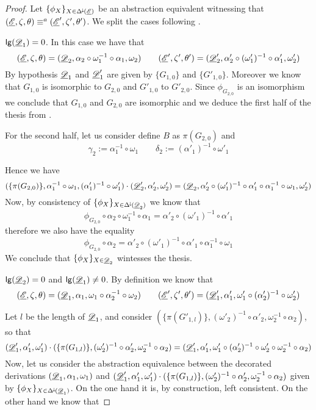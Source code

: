 \begin{proof} Let $\{\phi_X\}_{X\in \Delta^{\hspace{-1pt}\downarrow\hspace{-1pt}}(\underline{\mathscr{E}})}$ be an abstraction equivalent witnessing that $(\underline{\mathscr{E}}, \zeta, \theta)\equiv^{a}(\underline{\mathscr{E}}', \zeta', \theta')$.	We split the cases following .
	
	\smallskip \noindent $\mathsf{lg}(\underline{\mathscr{D}}_1)=0$. In this case we have that
	\[(\underline{\mathscr{E}}, \zeta, \theta)=(\underline{\mathscr{D}}_2, \alpha_2\circ \omega^{-1}_1 \circ \alpha_1, \omega_2) \qquad (\underline{\mathscr{E}}', \zeta', \theta')=(\underline{\mathscr{D}}'_2, \alpha'_2\circ (\omega'_1)^{-1} \circ \alpha'_1, \omega'_2)\]
	By hypothesis $\underline{\mathscr{D}}_1$ and $\underline{\mathscr{D}}'_1$ are given by $\{G_{1,0}\}$ and $\{G'_{1,0}\}$. Moreover we know that $G_{1,0}$ is isomorphic to $G_{2,0}$ and  $G'_{1,0}$ to $G'_{2,0}$. Since $\phi_{G_{2,0}}$ is an isomorphism we conclude that $G_{1,0}$ and $G_{2,0}$ are isomorphic and we deduce the first half of the thesis from . 
	
	For the second half, let us consider define $B$ as $\pi(G_{2,0})$ and
	\[\gamma_2:=\alpha^{-1}_1\circ \omega_1\qquad  \delta_2:=(\alpha'_1)^{-1}\circ \omega'_1  \]
	
	Hence we have
\[
(\{\pi(G_{2,0})\}, \alpha^{-1}_1\circ \omega_1,  (\alpha'_1)^{-1}\circ \omega'_1 )\cdot(\underline{\mathscr{D}}'_2, \alpha'_2, \omega'_2)  =(\underline{\mathscr{D}}_2, \alpha'_2\circ (\omega'_1)^{-1} \circ \alpha'_1\circ \alpha_1^{-1}\circ \omega_1, \omega'_2)\]
Now, by consistency of $\{\phi_{X}\}_{X\in \Delta^{\hspace{-1pt}\downarrow\hspace{-1pt}}(\underline{\mathscr{D}}_2)}$ we know that
\[\phi_{G_{2,0}}\circ \alpha_2\circ \omega^{-1}_1\circ \alpha_1=\alpha'_2\circ (\omega'_1)^{-1} \circ \alpha'_1\]
	therefore we also have the equality
	\[\phi_{G_{2,0}}\circ \alpha_2=\alpha'_2\circ (\omega'_1)^{-1} \circ \alpha'_1 \circ \alpha^{-1}_1\circ \omega_1 \]
	We conclude that $\{\phi_X\}_{X\in \underline{\mathscr{D}}_2}$ wintesses the thesis.
	
	\smallskip \noindent $\mathsf{lg}(\underline{\mathscr{D}}_2)=0$ and $\mathsf{lg}(\underline{\mathscr{D}}_1)\neq 0$. By definition we know that
	\[(\underline{\mathscr{E}}, \zeta, \theta)=(\underline{\mathscr{D}}_1, \alpha_1, \omega_1\circ \alpha_2^{-1}\circ \omega_2) \qquad (\underline{\mathscr{E}}', \zeta', \theta')=(\underline{\mathscr{D}}'_1, \alpha'_1, \omega'_1\circ (\alpha'_2)^{-1}\circ \omega'_2)\]
	
	Let $l$ be the length of $\underline{\mathscr{D}}_1$, and consider $(\{\pi(G'_{1, l})\}, (\omega'_2)^{-1}\circ \alpha'_2, \omega^{-1}_2\circ \alpha_2)$, so that
	\[ (\underline{\mathscr{D}}'_1, \alpha'_1, \omega'_1) \cdot  (\{\pi(G_{1, l})\}, (\omega'_2)^{-1}\circ \alpha'_2, \omega^{-1}_2\circ \alpha_2)= (\underline{\mathscr{D}}'_1, \alpha'_1, \omega'_1\circ (\alpha'_2)^{-1}\circ \omega'_2 \circ \omega^{-1}_2\circ \alpha_2)\]
	Now, let us consider the abstraction equivalence between  the decorated derivations $(\underline{\mathscr{D}}_1, \alpha_1, \omega_1)$ and  $(\underline{\mathscr{D}}'_1, \alpha'_1, \omega'_1) \cdot  (\{\pi(G_{1, l})\}, (\omega'_2)^{-1}\circ \alpha'_2, \omega^{-1}_2\circ \alpha_2)$ given by $\{\phi_X\}_{X\in \Delta^{\hspace{-1pt}\downarrow\hspace{-1pt}}(\underline{\mathscr{D}}_1)}$. On the one hand it is, by construction, left consistent.  On the other hand we know that 
	 

\end{proof}
